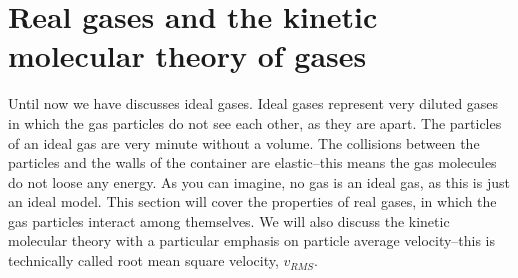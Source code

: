 \documentclass[main.tex]{subfiles}
\begin{document}
\section{Real gases and the kinetic molecular theory of gases }
Until now we have discusses ideal gases. Ideal gases represent very diluted gases in which the gas particles do not see each other, as they are apart. The particles of an ideal gas are very minute without a volume. The collisions between the particles and the walls of the container are elastic--this means the gas molecules do not loose any energy. As you can imagine, no gas is an ideal gas, as this is just an ideal model. This section will cover the properties of real gases, in which the gas particles interact among themselves. We will also discuss the kinetic molecular theory with a particular emphasis on particle average velocity--this is technically called root mean square velocity, $v_{RMS}$. 
\sloppy 
\end{document}
